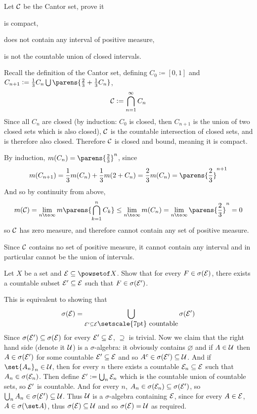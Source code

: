 \def\C{{\cal C}}
\bexerc

    Let $\C$ be the Cantor set, prove it
    \benum
        \item is compact,
        \item does not contain any interval of positive measure,
        \item is not the countable union of closed intervals.
    \eenum

\eexerc

\benum
    \item Recall the definition of the Cantor set, defining $C_0\coloneqq[0,1]$ and $C_{n+1}\coloneqq\frac13C_n\bigcup\parens{\frac23+\frac13C_n}$,
    $$ \C \coloneqq \bigcap_{n=1}^\infty C_n $$
    Since all $C_n$ are closed (by induction: $C_0$ is closed, then $C_{n+1}$ is the union of two closed sets which is also closed), $\C$ is the countable intersection of closed sets, and is therefore also
    closed.
    Therefore $\C$ is closed and bound, meaning it is compact.
    \item By induction, $m(C_n)=\parens{\frac23}^n$, since
    $$ m(C_{n+1}) = \frac13m(C_n) + \frac13m(2+C_n) = \frac23m(C_n) = \parens{\frac23}^{n+1} $$
    And so by continuity from above,
    $$ m(\C) = \lim_{n\to\infty}m\parens{\bigcap_{k=1}^n C_k} \leq \lim_{n\to\infty}m(C_n) = \lim_{n\to\infty}\parens{\frac23}^n = 0 $$
    so $\C$ has zero measure, and therefore cannot contain any set of positive measure.
    \item Since $\C$ contains no set of positive measure, it cannot contain any interval and in particular cannot be the union of intervals.
\eenum

\def\E{{\cal E}}
\bexerc

    Let $X$ be a set and $\E\subseteq\powsetof X$.
    Show that for every $F\in\sigma(\E)$, there exists a countable subset $\E'\subseteq\E$ such that $F\in\sigma(\E')$.

\eexerc

This is equivalent to showing that
$$ \sigma(\E) = \bigcup_{\E'\subseteq\E\hbox{\setscale{7pt} countable}}\sigma(\E') $$
Since $\sigma(\E')\subseteq\sigma(\E)$ for every $\E'\subseteq\E$, $\supseteq$ is trivial.
Now we claim that the right hand side (denote it \def\U{{\cal U}} $\U$) is a $\sigma$-algebra: it obviously contains $\varnothing$ and if $A\in\U$ then $A\in\sigma(\E')$ for some countable $\E'\subseteq\E$
and so $A^c\in\sigma(\E')\subseteq\U$.
And if $\set{A_n}_n\in\U$, then for every $n$ there exists a countable $\E_n\subseteq\E$ such that $A_n\in\sigma(\E_n)$.
Then define $\E'\coloneqq\bigcup_n\E_n$ which is the countable union of countable sets, so $\E'$ is countable.
And for every $n$, $A_n\in\sigma(\E_n)\subseteq\sigma(\E')$, so $\bigcup_nA_n\in\sigma(\E')\subseteq\U$.
Thus $\U$ is a $\sigma$-algebra containing $\E$, since for every $A\in\E$, $A\in\sigma(\set A)$, thus $\sigma(\E)\subseteq\U$ and so $\sigma(\E)=\U$ as required.

\bye

